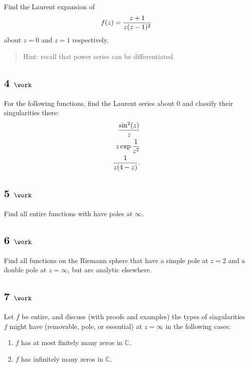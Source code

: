 Find the Laurent expansion of
\begin{align*}
f(z) = {z+1 \over z(z-1)^2}
\end{align*}
about \(z=0\) and \(z=1\) respectively.

\begin{quote}
Hint: recall that power series can be differentiated.
\end{quote}

\hypertarget{work-43}{%
\subsection{\texorpdfstring{4
\(\work\)}{4 \textbackslash work}}\label{work-43}}

For the following functions, find the Laurent series about \(0\) and
classify their singularities there:
\begin{align*}
{\sin^2(z) \over z} \\
z \exp{1\over z^2} \\
{1 \over z(4-z)}
.\end{align*}

\hypertarget{work-44}{%
\subsection{\texorpdfstring{5
\(\work\)}{5 \textbackslash work}}\label{work-44}}

Find all entire functions with have poles at \(\infty\).

\hypertarget{work-45}{%
\subsection{\texorpdfstring{6
\(\work\)}{6 \textbackslash work}}\label{work-45}}

Find all functions on the Riemann sphere that have a simple pole at
\(z=2\) and a double pole at \(z=\infty\), but are analytic elsewhere.

\hypertarget{work-46}{%
\subsection{\texorpdfstring{7
\(\work\)}{7 \textbackslash work}}\label{work-46}}

Let \(f\) be entire, and discuss (with proofs and examples) the types of
singularities \(f\) might have (removable, pole, or essential) at
\(z=\infty\) in the following cases:

\begin{enumerate}
\def\labelenumi{\arabic{enumi}.}
\tightlist
\item
  \(f\) has at most finitely many zeros in \({\mathbb{C}}\).
\item
  \(f\) has infinitely many zeros in \({\mathbb{C}}\).
\end{enumerate}

